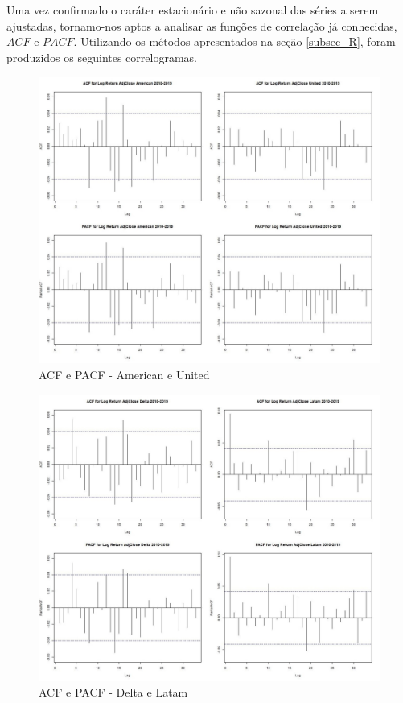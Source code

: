 \documentclass[12pt]{article}
\begin{document}
Uma vez confirmado o caráter estacionário e não sazonal das séries a serem ajustadas, tornamo-nos aptos a analisar as funções de correlação já conhecidas, $ACF$ e $PACF$. Utilizando os métodos apresentados na seção \ref{subsec_R}, foram produzidos os seguintes correlogramas. 

\begin{figure}[H]
	\centering
	\includegraphics[width=0.8\linewidth]{../Modelos/CorrelationsUSA10_19}
	\caption{ACF e PACF - American e United}
	\label{fig:correlationsusa1019}
\end{figure}

\begin{figure}[H]
	\centering
	\includegraphics[width=0.8\linewidth]{../Modelos/CorrelationsDeltaLat10_19}
	\caption{ACF e PACF - Delta e Latam}
	\label{fig:correlationsdeltalat1019}
\end{figure}
\end{document}
